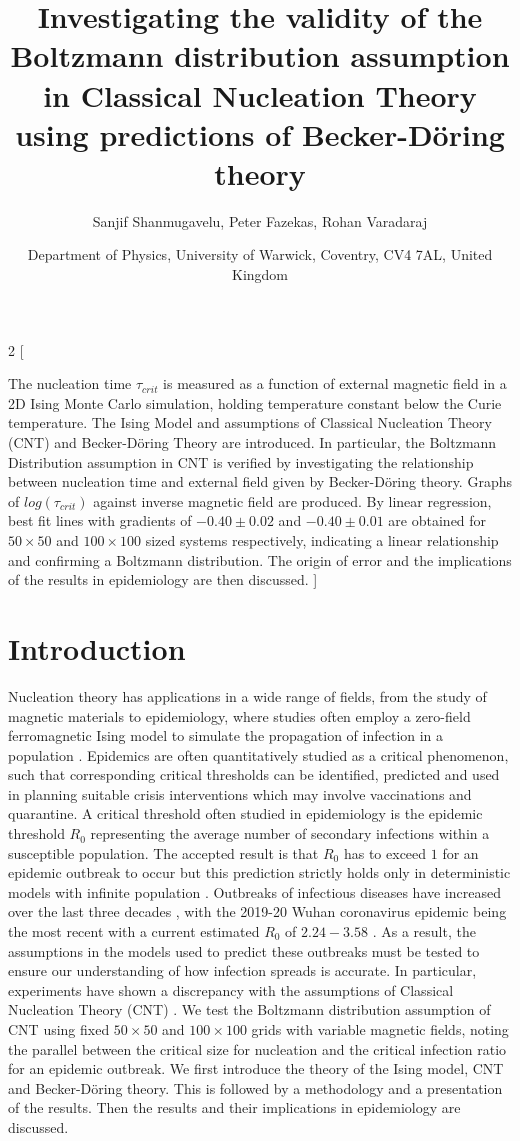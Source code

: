 \documentclass{article}
\title{Investigating the validity of the Boltzmann distribution assumption in Classical Nucleation Theory using predictions of Becker-Döring theory}
\author{Sanjif Shanmugavelu, Peter Fazekas, Rohan Varadaraj}
\date{Department of Physics, University of Warwick, Coventry, CV4 7AL, United Kingdom}
\begin{document}
\sloppy
\begin{multicols*}{2}
[
\maketitle
The nucleation time $\tau_{crit}$ is measured as a function of external magnetic field in a 2D Ising Monte Carlo simulation, holding temperature constant below the Curie temperature. The Ising Model and assumptions of Classical Nucleation Theory (CNT) and Becker-Döring Theory are introduced. In particular, the Boltzmann Distribution assumption in CNT is verified by investigating the relationship between nucleation time and external field given by Becker-Döring theory. Graphs of $log(\tau_{crit})$ against inverse magnetic field are produced. By linear regression, best fit lines with gradients of $-0.40 \pm 0.02$ and $-0.40 \pm 0.01$ are obtained for $50 \times 50$ and $100 \times 100$ sized systems respectively, indicating a linear relationship and confirming a Boltzmann distribution. The origin of error and the implications of the results in epidemiology are then discussed.
]

\section{Introduction}

Nucleation theory has applications in a wide range of fields, from the study of magnetic materials to epidemiology, where studies often employ a zero-field ferromagnetic Ising model to simulate the propagation of infection in a population \cite{crisostomo}. Epidemics are often  quantitatively studied as a critical phenomenon, such that corresponding critical thresholds can be identified, predicted and used in planning suitable crisis interventions which may involve vaccinations and quarantine. A critical threshold often studied in epidemiology is the epidemic threshold  $R_{0}$ representing the average number of secondary infections within a susceptible population. The accepted result is that $R_{0}$ has to exceed $1$ for an epidemic outbreak to occur but this prediction strictly holds only in deterministic models with infinite population \cite{harding}. Outbreaks of infectious diseases have increased over the last three decades \cite{houlihan}, with the 2019-20 Wuhan coronavirus epidemic being the most recent \cite{wu} with a current estimated $R_{0}$ of $2.24 - 3.58$ \cite{zhao}. As a result, the assumptions in the models used to predict these outbreaks must be tested to ensure our understanding of how infection spreads is accurate. In particular, experiments have shown a discrepancy with the assumptions of Classical Nucleation Theory (CNT) \cite{ryu}. We test the Boltzmann distribution assumption of CNT using fixed $50 \times 50$ and $100 \times 100$ grids with variable magnetic fields, noting the parallel between the critical size for nucleation and the critical infection ratio for an epidemic outbreak. We first introduce the theory of the Ising model, CNT and Becker-Döring theory. This is followed by a methodology and a presentation of the results. Then the results and their implications in epidemiology are discussed.


\end{multicols*}
\end{document}
